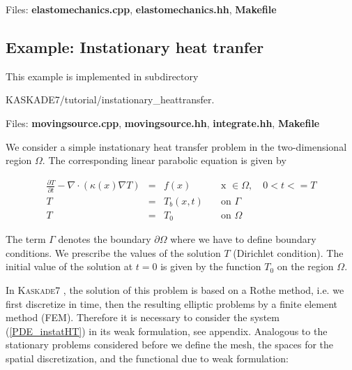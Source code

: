 \documentclass[11pt]{article}
\newcommand{\K}{\textsc{Kaskade7 }}
\begin{document}
\noindent Files: {\bf elastomechanics.cpp}, {\bf elastomechanics.hh}, {\bf Makefile}



\subsection{Example: Instationary heat tranfer}\label{InstatHeat}
This example is implemented in subdirectory 
\begin{center} KASKADE7/tutorial/instationary\_heattransfer.\end{center}

\noindent Files: {\bf movingsource.cpp}, {\bf movingsource.hh}, {\bf integrate.hh}, {\bf Makefile}

\noindent We consider a simple instationary heat transfer problem in the two-dimensional 
region $\Omega$. The corresponding linear parabolic equation is given by


\begin{equation}\label{PDE_instatHT}
\begin{array}{rccc}
\displaystyle \frac{\partial T}{\partial t} -\nabla  \cdot (\kappa(x) \nabla T) &=& f(x) \quad &\mbox{x }\in  \Omega, \quad 0 < t <= T\\[2mm]
T &=& T_b(x,t) \quad & \mbox{on } \Gamma\\[2mm]
T &=& T_0  \quad & \mbox{on } \Omega
\end{array}
\end{equation}

\noindent The term $\Gamma$  denotes the boundary $\partial \Omega $ where we have to define 
boundary conditions. We prescribe the values of the solution $T$ (Dirichlet condition).
The initial value of the solution at $t=0$ is given by the function $T_0$ on the region $\Omega$.

In \K, the solution of this problem is based on a Rothe method, i.e.  we first discretize in time, then
the resulting elliptic problems by a finite element method (FEM). Therefore it is necessary to consider
the system (\ref{PDE_instatHT}) in its weak formulation, see appendix. 
Analogous to the stationary problems considered before we define the mesh, the spaces 
for the spatial discretization, and the functional due to weak formulation:
\end{document}
